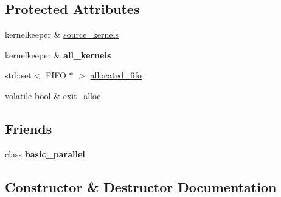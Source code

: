 \subsection*{Protected Attributes}
\begin{DoxyCompactItemize}
\item 
kernelkeeper \& \hyperlink{class_allocate_a93e612d7ea7eb686fc88b5dee7a1407b}{source\+\_\+kernels}
\item 
\hypertarget{class_allocate_a91e8c7d69ab7b309ea45439aea54fb4f}{}kernelkeeper \& {\bfseries all\+\_\+kernels}\label{class_allocate_a91e8c7d69ab7b309ea45439aea54fb4f}

\item 
std\+::set$<$ F\+I\+F\+O $\ast$ $>$ \hyperlink{class_allocate_a037410210c0d10578f87de1ec68f47ba}{allocated\+\_\+fifo}
\item 
volatile bool \& \hyperlink{class_allocate_a4d10076b88ab1297c89b8a05e117b510}{exit\+\_\+alloc}
\end{DoxyCompactItemize}
\subsection*{Friends}
\begin{DoxyCompactItemize}
\item 
\hypertarget{class_allocate_a901ac6fe1c35f3c114cf9e83f75dde0c}{}class {\bfseries basic\+\_\+parallel}\label{class_allocate_a901ac6fe1c35f3c114cf9e83f75dde0c}

\end{DoxyCompactItemize}


\subsection{Constructor \& Destructor Documentation}
\hypertarget{class_allocate_a61d8b01e404c23ead20068035e3ba540}{}
